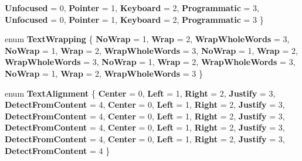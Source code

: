 \begin{DoxyCompactItemize}
{\bfseries Unfocused} = 0, 
{\bfseries Pointer} = 1, 
{\bfseries Keyboard} = 2, 
{\bfseries Programmatic} = 3, 
\newline
{\bfseries Unfocused} = 0, 
{\bfseries Pointer} = 1, 
{\bfseries Keyboard} = 2, 
{\bfseries Programmatic} = 3
 \}
\item 
\mbox{\label{namespace_windows_1_1_u_i_1_1_xaml_aa8ebfd3700e5b390858676152a8a58e9}} 
enum {\bfseries Text\+Wrapping} \{ \newline
{\bfseries No\+Wrap} = 1, 
{\bfseries Wrap} = 2, 
{\bfseries Wrap\+Whole\+Words} = 3, 
{\bfseries No\+Wrap} = 1, 
\newline
{\bfseries Wrap} = 2, 
{\bfseries Wrap\+Whole\+Words} = 3, 
{\bfseries No\+Wrap} = 1, 
{\bfseries Wrap} = 2, 
\newline
{\bfseries Wrap\+Whole\+Words} = 3, 
{\bfseries No\+Wrap} = 1, 
{\bfseries Wrap} = 2, 
{\bfseries Wrap\+Whole\+Words} = 3, 
\newline
{\bfseries No\+Wrap} = 1, 
{\bfseries Wrap} = 2, 
{\bfseries Wrap\+Whole\+Words} = 3
 \}
\item 
\mbox{\label{namespace_windows_1_1_u_i_1_1_xaml_a096a1b0a726ae821c5a11e30eb861b63}} 
enum {\bfseries Text\+Alignment} \{ \newline
{\bfseries Center} = 0, 
{\bfseries Left} = 1, 
{\bfseries Right} = 2, 
{\bfseries Justify} = 3, 
\newline
{\bfseries Detect\+From\+Content} = 4, 
{\bfseries Center} = 0, 
{\bfseries Left} = 1, 
{\bfseries Right} = 2, 
\newline
{\bfseries Justify} = 3, 
{\bfseries Detect\+From\+Content} = 4, 
{\bfseries Center} = 0, 
{\bfseries Left} = 1, 
\newline
{\bfseries Right} = 2, 
{\bfseries Justify} = 3, 
{\bfseries Detect\+From\+Content} = 4, 
{\bfseries Center} = 0, 
\newline
{\bfseries Left} = 1, 
{\bfseries Right} = 2, 
{\bfseries Justify} = 3, 
{\bfseries Detect\+From\+Content} = 4, 
\newline
{\bfseries Center} = 0, 
{\bfseries Left} = 1, 
{\bfseries Right} = 2, 
{\bfseries Justify} = 3, 
\newline
{\bfseries Detect\+From\+Content} = 4
 \}
\item 
\mbox{\label{namespace_windows_1_1_u_i_1_1_xaml_ace78659e508744cb10b2d252833ef022}} 

\end{DoxyCompactItemize}
